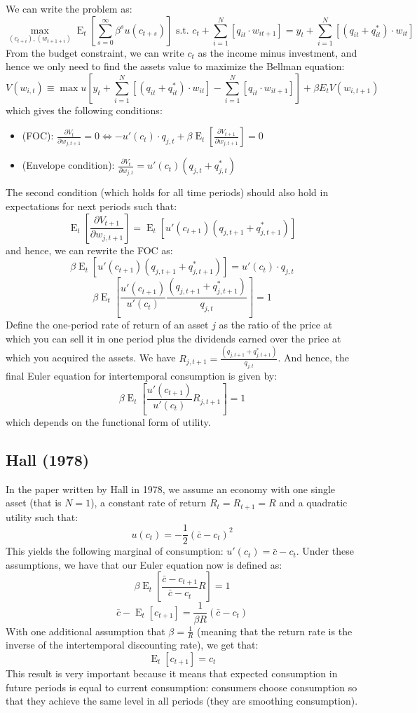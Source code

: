 \documentclass[12pt]{report}
\newcommand{\Et}[1]{\operatorname{E}_t\left[#1\right]}
\begin{document}
We can write the problem as: $$\max_{(c_{t+i}), (w_{t+1+i})} \Et{\sum_{s=0}^{\infty} \beta^{s} u(c_{t+s})} \text{ s.t. } c_t + \sum_{i=1}^{N} [ q_{it} \cdot w_{it+1} ] = y_t + \sum_{i=1}^{N}[(q_{it} + q_{it}^*)\cdot w_{it} ] $$ From the budget constraint, we can write $c_t$ as the income minus investment, and hence we only need to find the assets value to maximize the Bellman equation: $$V(w_{i,t}) \equiv \max u\left[y_t + \sum_{i=1}^{N}[(q_{it} + q_{it}^*)\cdot w_{it} ] - \sum_{i=1}^{N} [ q_{it} \cdot w_{it+1} ]\right] + \beta E_t{V(w_{i,t+1})} $$ which gives the following conditions:\begin{itemize}
\item (FOC): $\frac{\partial V_t}{\partial w_{j,t+1}} = 0 \Leftrightarrow - u'(c_t)\cdot q_{j,t} + \beta\Et{\frac{\partial V_{t+1}}{\partial w_{j,t+1}}} = 0$ 
\item (Envelope condition): $\frac{\partial V_t}{\partial w_{j,t}} = u'(c_t)(q_{j,t} + q_{j,t}^*) $ 
\end{itemize}

The second condition (which holds for all time periods) should also hold in expectations for next periods such that: $$\Et{\frac{\partial V_{t+1}}{\partial w_{j,t+1}}} = \Et{u'(c_{t+1})(q_{j,t+1} + q_{j,t+1}^*)} $$ and hence, we can rewrite the FOC as: $$ \beta\Et{u'(c_{t+1})(q_{j,t+1} + q_{j,t+1}^*)} = u'(c_t)\cdot q_{j,t} $$ $$\beta\Et{\frac{u'(c_{t+1})}{u'(c_t)}\frac{(q_{j,t+1} + q_{j,t+1}^*)}{q_{j,t}}} = 1 $$ Define the one-period rate of return of an asset $j$ as the ratio of the price at which you can sell it in one period plus the dividends earned over the price at which you acquired the assets. We have $R_{j,t+1} = \frac{(q_{j,t+1} + q_{j,t+1}^*)}{q_{j,t}}$. And hence, the final Euler equation for intertemporal consumption is given by: $$\beta\Et{\frac{u'(c_{t+1})}{u'(c_t)}R_{j,t+1}} = 1 
$$ which depends on the functional form of utility.

\subsection{Hall (1978)}

In the paper written by Hall in 1978, we assume an economy with one single asset (that is $N=1$), a constant rate of return $R_t = R_{t+1} = R$ and a quadratic utility such that: $$u(c_t) = -\frac{1}{2} (\bar c - c_t)^2 $$ This yields the following marginal of consumption: $u'(c_t) = \bar c - c_t $. Under these assumptions, we have that our Euler equation now is defined as: $$\beta\Et{\frac{\bar c - c_{t+1}}{\bar c - c_{t}}R} = 1 $$ $$\bar c - \Et{c_{t+1}} = \frac{1}{\beta R}(\bar c - c_t) $$ With one additional assumption that $\beta = \frac{1}{R}$ (meaning that the return rate is the inverse of the intertemporal discounting rate), we get that: $$\Et{c_{t+1}} = c_t$$ This result is very important because it means that expected consumption in future periods is equal to current consumption: consumers choose consumption so that they achieve the same level in all periods (they are smoothing consumption).
\end{document}
